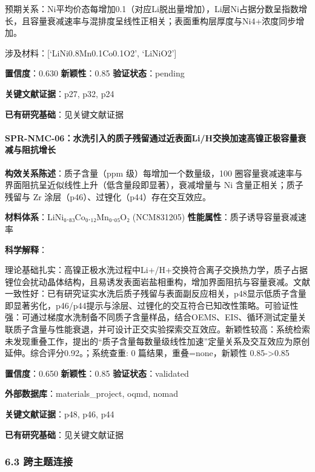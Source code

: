 \documentclass[12pt,a4paper]{ctexart}
\begin{document}
预期关系：Ni平均价态每增加0.1（对应Li脱出量增加），Li层Ni占据分数呈指数增长，且容量衰减速率与混排度呈线性正相关；表面重构层厚度与Ni4+浓度同步增加。

涉及材料：{[}`LiNi0.8Mn0.1Co0.1O2', `LiNiO2'{]}

\textbf{置信度}：0.630 \textbar{} \textbf{新颖性}：0.85 \textbar{} \textbf{验证状态}：pending

\textbf{关键文献证据}：p27, p32, p24

\textbf{已有研究基础}：见关键文献证据

\paragraph{SPR-NMC-06：水洗引入的质子残留通过近表面Li/H交换加速高镍正极容量衰减与阻抗增长}\label{spr-nmc-06ux6c34ux6d17ux5f15ux5165ux7684ux8d28ux5b50ux6b8bux7559ux901aux8fc7ux8fd1ux8868ux9762lihux4ea4ux6362ux52a0ux901fux9ad8ux954dux6b63ux6781ux5bb9ux91cfux8870ux51cfux4e0eux963bux6297ux589eux957f}

\textbf{构效关系陈述}：质子含量（ppm 级）每增加一个数量级，100 圈容量衰减速率与界面阻抗呈近似线性上升（低含量段即显著），衰减增量与 Ni 含量正相关；质子残留与 Zr 涂层（p46）、过锂化（p44）存在交互效应。

\textbf{材料体系}：LiNi₀.₈₃Co₀.₁₂Mn₀.₀₅O₂ (NCM831205) \textbar{} \textbf{性能属性}：质子诱导容量衰减速率

\textbf{科学解释}：

理论基础扎实：高镍正极水洗过程中Li+/H+交换符合离子交换热力学，质子占据锂位会扰动晶体结构，且易诱发表面岩盐相重构，增加界面阻抗与容量衰减。文献一致性好：已有研究证实水洗后质子残留与表面副反应相关，p48显示低质子含量即显著劣化，p46/p44提示与涂层、过锂化的交互符合已知改性策略。可验证性强：可通过梯度水洗制备不同质子含量样品，结合OEMS、EIS、循环测试定量关联质子含量与性能衰退，并可设计正交实验探索交互效应。新颖性较高：系统检索未发现重叠工作，提出的``质子含量每数量级线性加速''定量关系及交互效应为原创延伸。综合评分0.92。；系统查重: 0 篇结果，重叠=none，新颖性 0.85-\textgreater0.85

\textbf{置信度}：0.650 \textbar{} \textbf{新颖性}：0.85 \textbar{} \textbf{验证状态}：validated

\textbf{外部数据库}：materials\_project, oqmd, nomad

\textbf{关键文献证据}：p48, p46, p44

\textbf{已有研究基础}：见关键文献证据

\subsubsection{6.3 跨主题连接}\label{ux8de8ux4e3bux9898ux8fdeux63a5-3}
\end{document}
